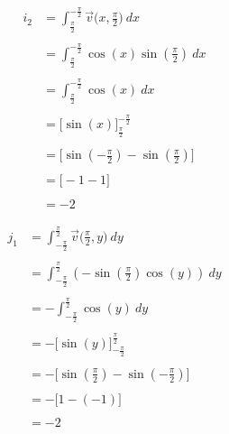 \documentclass{article}
\begin{document}
\begin{flushle}
\begin{multicols}{2}
\begin{align*}
i_2 & = \int_{\frac{\pi}{2}}^{-\frac{\pi}{2}}\vec{v}\bigg(x, \frac{\pi}{2}\bigg) \ dx \\ \\
 & = \int_{\frac{\pi}{2}}^{-\frac{\pi}{2}} \cos{(x)}\sin{(\frac{\pi}{2})} \ dx \\ \\
 & = \int_{\frac{\pi}{2}}^{-\frac{\pi}{2}} \cos{(x)} \ dx \\ \\
 & = \bigg[ \sin{(x)} \bigg]_{\frac{\pi}{2}}^{-\frac{\pi}{2}} \\ \\
 & = \bigg[ \sin{(-\frac{\pi}{2})} - \sin{(\frac{\pi}{2})} \bigg] \\ \\
 & = \bigg[ -1-1 \bigg] \\ \\
 & = -2
\end{align*}
\end{multicols}

\newpage

\begin{multicols}{2}
\begin{align*}
j_1 & = \int_{-\frac{\pi}{2}}^{\frac{\pi}{2}}\vec{v}\bigg(\frac{\pi}{2}, y\bigg) \ dy \\ \\
 & = \int_{-\frac{\pi}{2}}^{\frac{\pi}{2}} (-\sin{(\frac{\pi}{2})}\cos{(y)}) \ dy \\ \\
 & = -\int_{-\frac{\pi}{2}}^{\frac{\pi}{2}} \cos{(y)} \ dy \\ \\
 & = -\bigg[ \sin{(y)} \bigg]_{-\frac{\pi}{2}}^{\frac{\pi}{2}} \\ \\
 & = -\bigg[ \sin{(\frac{\pi}{2})} - \sin{(-\frac{\pi}{2})} \bigg] \\ \\
 & = -\bigg[ 1-(-1) \bigg] \\ \\
 & = -2
\end{align*}


\end{multicols}
\end{flushle}
\end{document}
